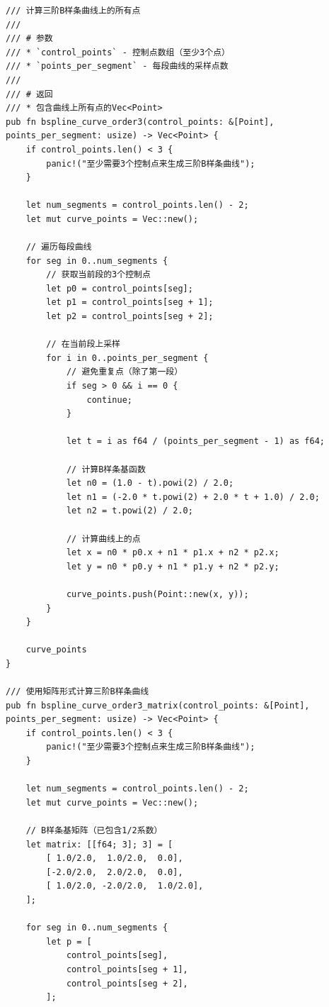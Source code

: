 \documentclass[12pt,a4paper]{article}
\begin{document}
\begin{lstlisting}
/// 计算三阶B样条曲线上的所有点
/// 
/// # 参数
/// * `control_points` - 控制点数组（至少3个点）
/// * `points_per_segment` - 每段曲线的采样点数
/// 
/// # 返回
/// * 包含曲线上所有点的Vec<Point>
pub fn bspline_curve_order3(control_points: &[Point], points_per_segment: usize) -> Vec<Point> {
    if control_points.len() < 3 {
        panic!("至少需要3个控制点来生成三阶B样条曲线");
    }
    
    let num_segments = control_points.len() - 2;
    let mut curve_points = Vec::new();
    
    // 遍历每段曲线
    for seg in 0..num_segments {
        // 获取当前段的3个控制点
        let p0 = control_points[seg];
        let p1 = control_points[seg + 1];
        let p2 = control_points[seg + 2];
        
        // 在当前段上采样
        for i in 0..points_per_segment {
            // 避免重复点（除了第一段）
            if seg > 0 && i == 0 {
                continue;
            }
            
            let t = i as f64 / (points_per_segment - 1) as f64;
            
            // 计算B样条基函数
            let n0 = (1.0 - t).powi(2) / 2.0;
            let n1 = (-2.0 * t.powi(2) + 2.0 * t + 1.0) / 2.0;
            let n2 = t.powi(2) / 2.0;
            
            // 计算曲线上的点
            let x = n0 * p0.x + n1 * p1.x + n2 * p2.x;
            let y = n0 * p0.y + n1 * p1.y + n2 * p2.y;
            
            curve_points.push(Point::new(x, y));
        }
    }
    
    curve_points
}

/// 使用矩阵形式计算三阶B样条曲线
pub fn bspline_curve_order3_matrix(control_points: &[Point], points_per_segment: usize) -> Vec<Point> {
    if control_points.len() < 3 {
        panic!("至少需要3个控制点来生成三阶B样条曲线");
    }
    
    let num_segments = control_points.len() - 2;
    let mut curve_points = Vec::new();
    
    // B样条基矩阵（已包含1/2系数）
    let matrix: [[f64; 3]; 3] = [
        [ 1.0/2.0,  1.0/2.0,  0.0],
        [-2.0/2.0,  2.0/2.0,  0.0],
        [ 1.0/2.0, -2.0/2.0,  1.0/2.0],
    ];
    
    for seg in 0..num_segments {
        let p = [
            control_points[seg],
            control_points[seg + 1],
            control_points[seg + 2],
        ];
        

\end{lstlisting}
\end{document}
